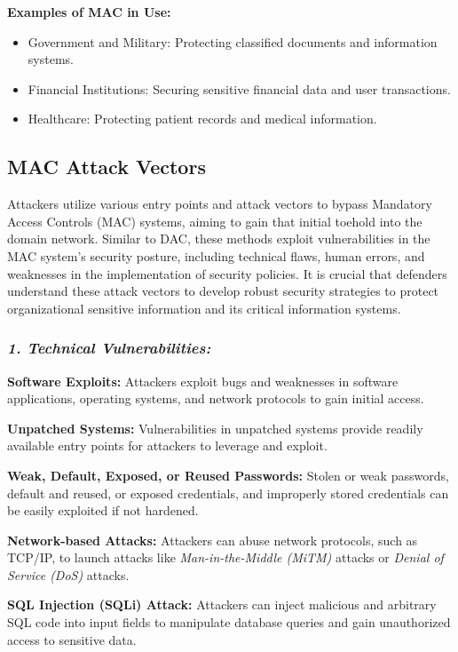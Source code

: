 \textbf{Examples of MAC in Use:}
\begin{itemize}
    \item Government and Military: Protecting classified documents and information systems.
    \item Financial Institutions: Securing sensitive financial data and user transactions.
    \item Healthcare: Protecting patient records and medical information.
\end{itemize}

\subsection{MAC Attack Vectors}
Attackers utilize various entry points and attack vectors to bypass Mandatory Access Controls (MAC) systems, aiming to gain that initial toehold into the domain network. Similar to DAC, these methods exploit vulnerabilities in the MAC system's security posture, including technical flaws, human errors, and weaknesses in the implementation of security policies. It is crucial that defenders understand these attack vectors to develop robust security strategies to protect organizational sensitive information and its critical information systems.

\subsubsection{\textit{1. Technical Vulnerabilities:}}
\textbf{Software Exploits:}
Attackers exploit bugs and weaknesses in software applications, operating systems, and network protocols to gain initial access.

\textbf{Unpatched Systems:}
Vulnerabilities in unpatched systems provide readily available entry points for attackers to leverage and exploit.

\textbf{Weak, Default, Exposed, or Reused Passwords:} Stolen or weak passwords, default and reused, or exposed credentials, and improperly stored credentials can be easily exploited if not hardened.

\textbf{Network-based Attacks:}
Attackers can abuse network protocols, such as TCP/IP, to launch attacks like \textit{Man-in-the-Middle (MiTM)} attacks or \textit{Denial of Service (DoS)} attacks.

\textbf{SQL Injection (SQLi) Attack:}
Attackers can inject malicious and arbitrary SQL code into input fields to manipulate database queries and gain unauthorized access to sensitive data.

